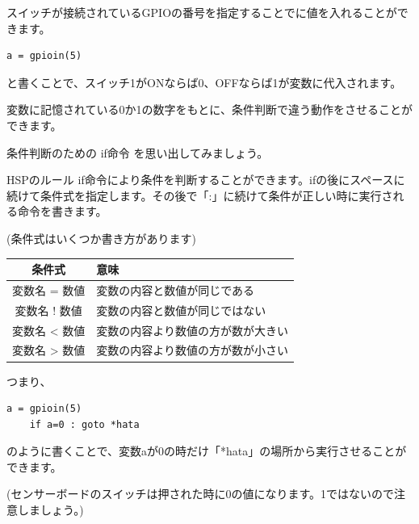 \documentclass[text04.tex]{subfiles}
\begin{document}
スイッチが接続されているGPIOの番号を指定することでに値を入れることができます。

\begin{lstlisting}[numbers=none]
    a = gpioin(5)
\end{lstlisting}

と書くことで、スイッチ1がONならば0、OFFならば1が変数に代入されます。

変数に記憶されている0か1の数字をもとに、条件判断で違う動作をさせることができます。

条件判断のための if命令 を思い出してみましょう。


\begin{itembox}[c]{HSPのルール}
    if命令により条件を判断することができます。ifの後にスペースに続けて条件式を指定します。その後で「:」に続けて条件が正しい時に実行される命令を書きます。
\end{itembox}

\begin{center}
    (条件式はいくつか書き方があります)
\end{center}
\begin{center}
    \begin{tabular}{cl} \hline
        条件式 & 意味 \\ \hline
        変数名 = 数値 & 変数の内容と数値が同じである \\
        変数名 ! 数値 & 変数の内容と数値が同じではない \\
        変数名 {\textless} 数値 & 変数の内容より数値の方が数が大きい \\
        変数名 {\textgreater} 数値 & 変数の内容より数値の方が数が小さい \\ \hline
    \end{tabular}
\end{center}

つまり、


\begin{lstlisting}[numbers=none]
    a = gpioin(5)
    if a=0 : goto *hata
\end{lstlisting}


のように書くことで、変数aが0の時だけ「*hata」の場所から実行させることができます。

(センサーボードのスイッチは押された時に0の値になります。1ではないので注意しましょう。)
\end{document}
